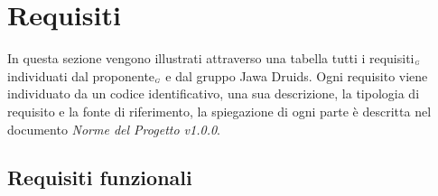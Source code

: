 \chapter{Requisiti}\label{Requisiti}
In questa sezione vengono illustrati attraverso una tabella tutti i requisiti$_{\scaleto{G}{3pt}}$ individuati dal proponente$_{\scaleto{G}{3pt}}$ e dal gruppo Jawa Druids. Ogni requisito viene individuato da un codice identificativo, una sua descrizione, la tipologia di requisito e la fonte di riferimento, la spiegazione di ogni parte è descritta nel documento \textit{Norme del Progetto v1.0.0}.
\section{Requisiti funzionali}\label{RequisitiFunzionali}




